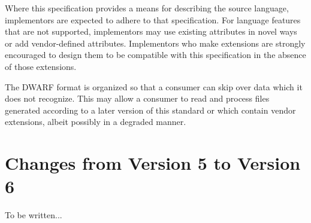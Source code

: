 Where this specification provides a means for
describing the source language, implementors are expected
to adhere to that specification. 
For language features that
are not supported, implementors may use existing attributes
in novel ways or add vendor-defined attributes. 
Implementors
who make extensions are strongly encouraged to design them
to be compatible with this specification in the absence of
those extensions.

The DWARF format is organized so that a consumer can skip over
data which it does not recognize. This may allow a consumer
to read and process files generated according to a later
version of this standard or which contain vendor extensions,
albeit possibly in a degraded manner.

\bb
\section{Changes from Version 5 to Version 6}
To be written...
\eb

